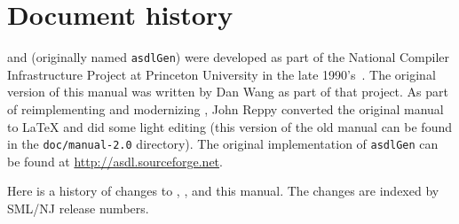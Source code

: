 %
\chapter{Document history}
\label{ch:history}

\asdl{} and \asdlgen{} (originally named \texttt{asdlGen}) were developed as part
of the National Compiler Infrastructure Project at Princeton University in the
late 1990's~\cite{usenix:zephyr-asdl}.
The original version of this manual was written by Dan Wang as part of that project.
As part of reimplementing and modernizing \asdl{}, John Reppy converted the original
manual to \LaTeX{} and did some light editing (this version of the old manual
can be found in the \texttt{doc/manual-2.0} directory).
The original implementation of \texttt{asdlGen} can be
found at \url{http://asdl.sourceforge.net}.

Here is a history of changes to \asdl{}, \asdlgen{}, and this manual.
The changes are indexed by SML/NJ release numbers.


